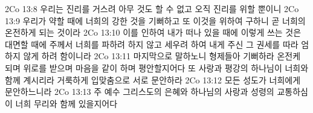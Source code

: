 2Co 13:8  우리는 진리를 거스려 아무 것도 할 수 없고 오직 진리를 위할 뿐이니
2Co 13:9  우리가 약할 때에 너희의 강한 것을 기뻐하고 또 이것을 위하여 구하니 곧 너희의 온전하게 되는 것이라
2Co 13:10  이를 인하여 내가 떠나 있을 때에 이렇게 쓰는 것은 대면할 때에 주께서 너희를 파하려 하지 않고 세우려 하여 내게 주신 그 권세를 따라 엄하지 않게 하려 함이니라
2Co 13:11  마지막으로 말하노니 형제들아 기뻐하라 온전케 되며 위로를 받으며 마음을 같이 하며 평안할지어다 또 사랑과 평강의 하나님이 너희와 함께 계시리라 거룩하게 입맞춤으로 서로 문안하라
2Co 13:12  모든 성도가 너희에게 문안하느니라
2Co 13:13  주 예수 그리스도의 은혜와 하나님의 사랑과 성령의 교통하심이 너희 무리와 함께 있을지어다


